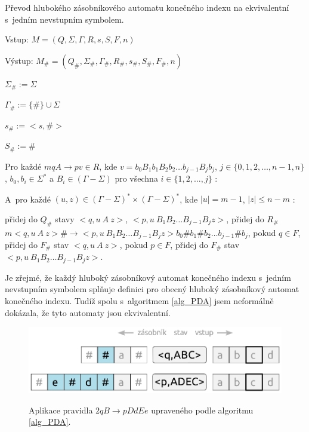 \begin{Alg} \label{alg_PDA}
Převod hlubokého zásobníkového automatu konečného indexu na ekvivalentní s~jedním nevstupním symbolem.

\begin{list}{}{\setlength\parsep{0cm} \setlength\itemsep{0cm} \setlength\leftmargin{1em}}
   \item Vstup: $M = (Q,\Sigma,\Gamma, R, s, S, F, n)$ 
   \item Výstup: $M_\# = (Q_\#,{\Sigma}_\#,{\Gamma}_\#, R_\#, s_\#,  S_\#, F_\#, n)$ \medskip
  
  \item ${\Sigma}_\# := \Sigma$
  \item ${\Gamma}_\# :=\{\#\} \cup \Sigma$
  \item $s_\# := <s,\#>$
  \item $S_\# := \# $ \medskip

  \item Pro každé $mqA \rightarrow pv \in R$, kde $v = b_0 B_1 b_1 B_2 b_2 \dots b_{j-1} B_{j} b_j$, $j \in \{0,1,2,\dots,n-1,n\}$, $b_0,b_i \in {\Sigma}^*$ a $B_i \in (\Gamma - \Sigma)$ pro všechna $i \in \{1,2,\dots,j\}$ : \smallskip

  \subitem A~pro každé $(u,z) \in (\Gamma - \Sigma)^* \times (\Gamma - \Sigma)^*$, kde $|u|=m-1$, $|z|\le n-m$ : \smallskip

  \subsubitem přidej do $Q_\#$ stavy $<q, u~A~z>$, $<p, u~B_1 B_2 \dots B_{j-1} B_{j} z>$,
  \subsubitem přidej do $R_\#$ $m <q, u~A~z> \# \rightarrow <p, u~B_1 B_2 \dots B_{j-1} B_{j} z> b_0 \# b_1 \# b_2 \dots b_{j-1} \# b_j $,
  \subsubitem pokud $q \in F$, přidej do $F_\#$ stav $<q, u~A~z>$,
  \subsubitem pokud $p \in F$, přidej do $F_\#$ stav $<p, u~B_1 B_2 \dots B_{j-1} B_{j} z>$.

\end{list}
\end{Alg}

Je zřejmé, že každý hluboký zásobníkový automat konečného indexu s~jedním nevstupním symbolem splňuje definici pro obecný hluboký zásobníkový automat konečného indexu. Tudíž spolu s~algoritmem \ref{alg_PDA} jsem neformálně dokázala, že tyto automaty jsou ekvivalentní.

\begin{figure}[ht]
\centering
\includegraphics{img/bp_pda03.eps} \bigskip \\
\caption{Aplikace pravidla $2 q B \rightarrow p DdEe$ upraveného podle algoritmu \ref{alg_PDA}.}
\end{figure}

